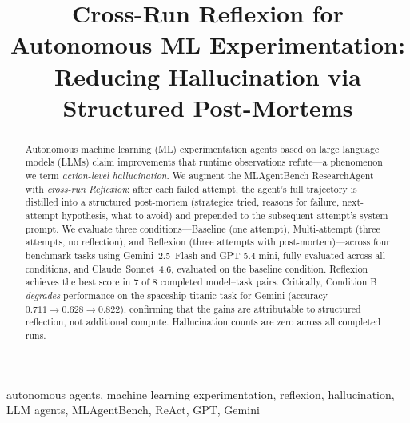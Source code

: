 \documentclass[conference]{IEEEtran}
\begin{document}
\title{Cross-Run Reflexion for Autonomous ML Experimentation:\\
Reducing Hallucination via Structured Post-Mortems}

\author{
    \and
}

\maketitle

\begin{abstract}
Autonomous machine learning (ML) experimentation agents based on large language
models (LLMs) claim improvements that runtime observations refute—a phenomenon
we term \emph{action-level hallucination}. We augment the MLAgentBench
ResearchAgent with \emph{cross-run Reflexion}: after each failed attempt, the
agent's full trajectory is distilled into a structured post-mortem
(strategies tried, reasons for failure, next-attempt hypothesis, what to avoid)
and prepended to the subsequent attempt's system prompt. We evaluate three
conditions—Baseline (one attempt), Multi-attempt (three attempts, no reflection),
and Reflexion (three attempts with post-mortem)—across four benchmark tasks
using Gemini~2.5~Flash and GPT-5.4-mini, fully evaluated across all conditions,
and Claude~Sonnet~4.6, evaluated on the baseline condition. Reflexion achieves
the best score in 7 of 8 completed model--task pairs. Critically, Condition B
\emph{degrades} performance on the spaceship-titanic task for Gemini
(accuracy $0.711\!\to\!0.628\!\to\!0.822$), confirming that the gains are
attributable to structured reflection, not additional compute. Hallucination
counts are zero across all completed runs.
\end{abstract}

\begin{IEEEkeywords}
autonomous agents, machine learning experimentation, reflexion, hallucination,
LLM agents, MLAgentBench, ReAct, GPT, Gemini
\end{IEEEkeywords}
\end{document}
